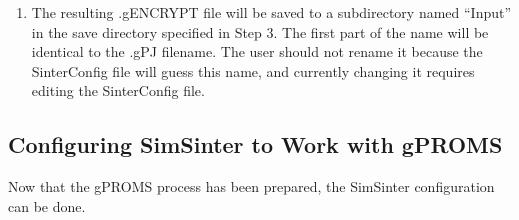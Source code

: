 \begin{enumerate}
\item The resulting .gENCRYPT file will be saved to a subdirectory named ``Input'' in the save directory specified in Step 3.  The first part of the name will be identical to the .gPJ filename.  The user should not rename it because the SinterConfig file will guess this name, and currently changing it requires editing the SinterConfig file.

\end{enumerate}

\subsection{Configuring SimSinter to Work with gPROMS}

Now that the gPROMS process has been prepared, the SimSinter configuration can be done.


